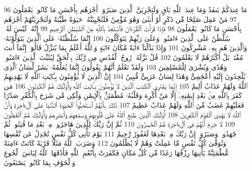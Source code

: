 {\tiny\colorbox{cl_aya}{96}} مَا عِندَكُمْ يَنفَدُ وَمَا عِندَ ٱللَّهِ بَاقٍ وَلَنَجْزِيَنَّ ٱلَّذِينَ صَبَرُوٓا۟ أَجْرَهُم بِأَحْسَنِ مَا كَانُوا۟ يَعْمَلُونَ
{\tiny\colorbox{cl_aya}{97}} مَنْ عَمِلَ صَٰلِحًا مِّن ذَكَرٍ أَوْ أُنثَىٰ وَهُوَ مُؤْمِنٌ فَلَنُحْيِيَنَّهُۥ حَيَوٰةً طَيِّبَةً وَلَنَجْزِيَنَّهُمْ أَجْرَهُم بِأَحْسَنِ مَا كَانُوا۟ يَعْمَلُونَ
{\tiny\colorbox{cl_aya}{98}} فَإِذَا قَرَأْتَ ٱلْقُرْءَانَ فَٱسْتَعِذْ بِٱللَّهِ مِنَ ٱلشَّيْطَٰنِ ٱلرَّجِيمِ
{\tiny\colorbox{cl_aya}{99}} إِنَّهُۥ لَيْسَ لَهُۥ سُلْطَٰنٌ عَلَى ٱلَّذِينَ ءَامَنُوا۟ وَعَلَىٰ رَبِّهِمْ يَتَوَكَّلُونَ
{\tiny\colorbox{cl_aya}{100}} إِنَّمَا سُلْطَٰنُهُۥ عَلَى ٱلَّذِينَ يَتَوَلَّوْنَهُۥ وَٱلَّذِينَ هُم بِهِۦ مُشْرِكُونَ
{\tiny\colorbox{cl_aya}{101}} وَإِذَا بَدَّلْنَآ ءَايَةً مَّكَانَ ءَايَةٍ وَٱللَّهُ أَعْلَمُ بِمَا يُنَزِّلُ قَالُوٓا۟ إِنَّمَآ أَنتَ مُفْتَرٍۭ بَلْ أَكْثَرُهُمْ لَا يَعْلَمُونَ
{\tiny\colorbox{cl_aya}{102}} قُلْ نَزَّلَهُۥ رُوحُ ٱلْقُدُسِ مِن رَّبِّكَ بِٱلْحَقِّ لِيُثَبِّتَ ٱلَّذِينَ ءَامَنُوا۟ وَهُدًى وَبُشْرَىٰ لِلْمُسْلِمِينَ
{\tiny\colorbox{cl_aya}{103}} وَلَقَدْ نَعْلَمُ أَنَّهُمْ يَقُولُونَ إِنَّمَا يُعَلِّمُهُۥ بَشَرٌ لِّسَانُ ٱلَّذِى يُلْحِدُونَ إِلَيْهِ أَعْجَمِىٌّ وَهَٰذَا لِسَانٌ عَرَبِىٌّ مُّبِينٌ
{\tiny\colorbox{cl_aya}{104}} إِنَّ ٱلَّذِينَ لَا يُؤْمِنُونَ بِـَٔايَٰتِ ٱللَّهِ لَا يَهْدِيهِمُ ٱللَّهُ وَلَهُمْ عَذَابٌ أَلِيمٌ
{\tiny\colorbox{cl_aya}{105}} إِنَّمَا يَفْتَرِى ٱلْكَذِبَ ٱلَّذِينَ لَا يُؤْمِنُونَ بِـَٔايَٰتِ ٱللَّهِ وَأُو۟لَٰٓئِكَ هُمُ ٱلْكَٰذِبُونَ
{\tiny\colorbox{cl_aya}{106}} مَن كَفَرَ بِٱللَّهِ مِنۢ بَعْدِ إِيمَٰنِهِۦٓ إِلَّا مَنْ أُكْرِهَ وَقَلْبُهُۥ مُطْمَئِنٌّۢ بِٱلْإِيمَٰنِ وَلَٰكِن مَّن شَرَحَ بِٱلْكُفْرِ صَدْرًا فَعَلَيْهِمْ غَضَبٌ مِّنَ ٱللَّهِ وَلَهُمْ عَذَابٌ عَظِيمٌ
{\tiny\colorbox{cl_aya}{107}} ذَٰلِكَ بِأَنَّهُمُ ٱسْتَحَبُّوا۟ ٱلْحَيَوٰةَ ٱلدُّنْيَا عَلَى ٱلْءَاخِرَةِ وَأَنَّ ٱللَّهَ لَا يَهْدِى ٱلْقَوْمَ ٱلْكَٰفِرِينَ
{\tiny\colorbox{cl_aya}{108}} أُو۟لَٰٓئِكَ ٱلَّذِينَ طَبَعَ ٱللَّهُ عَلَىٰ قُلُوبِهِمْ وَسَمْعِهِمْ وَأَبْصَٰرِهِمْ وَأُو۟لَٰٓئِكَ هُمُ ٱلْغَٰفِلُونَ
{\tiny\colorbox{cl_aya}{109}} لَا جَرَمَ أَنَّهُمْ فِى ٱلْءَاخِرَةِ هُمُ ٱلْخَٰسِرُونَ
{\tiny\colorbox{cl_aya}{110}} ثُمَّ إِنَّ رَبَّكَ لِلَّذِينَ هَاجَرُوا۟ مِنۢ بَعْدِ مَا فُتِنُوا۟ ثُمَّ جَٰهَدُوا۟ وَصَبَرُوٓا۟ إِنَّ رَبَّكَ مِنۢ بَعْدِهَا لَغَفُورٌ رَّحِيمٌ
{\tiny\colorbox{cl_aya}{111}} يَوْمَ تَأْتِى كُلُّ نَفْسٍ تُجَٰدِلُ عَن نَّفْسِهَا وَتُوَفَّىٰ كُلُّ نَفْسٍ مَّا عَمِلَتْ وَهُمْ لَا يُظْلَمُونَ
{\tiny\colorbox{cl_aya}{112}} وَضَرَبَ ٱللَّهُ مَثَلًا قَرْيَةً كَانَتْ ءَامِنَةً مُّطْمَئِنَّةً يَأْتِيهَا رِزْقُهَا رَغَدًا مِّن كُلِّ مَكَانٍ فَكَفَرَتْ بِأَنْعُمِ ٱللَّهِ فَأَذَٰقَهَا ٱللَّهُ لِبَاسَ ٱلْجُوعِ وَٱلْخَوْفِ بِمَا كَانُوا۟ يَصْنَعُونَ
